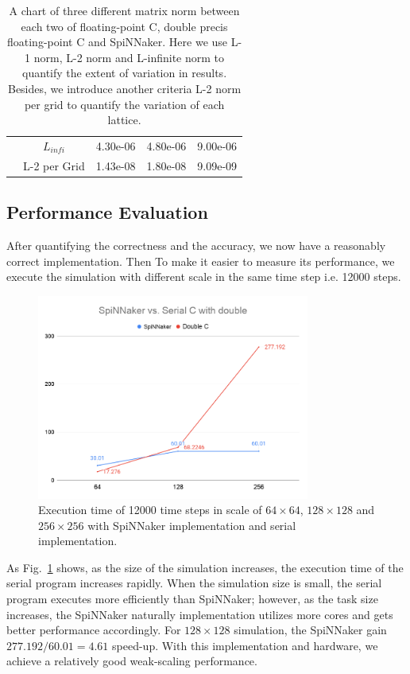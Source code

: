 \begin{table}[tb]
\begin{tabular}{|c|c|c|c|c|}
                     & $L_{infi}$  & 4.30e-06         & 4.80e-06           & 9.00e-06           \\ \cline{2-5} 
                     & L-2 per Grid & 1.43e-08           & 1.80e-08            & 9.09e-09              \\ \hline
\end{tabular}
\caption{A chart of three different matrix norm between each two of floating-point C, double precis floating-point C and SpiNNaker. Here we use L-1 norm, L-2 norm and L-infinite norm to quantify the extent of variation in results. Besides, we introduce another criteria L-2 norm per grid to quantify the variation of each lattice.}
\label{table:norm}
\end{table}

\subsection{Performance Evaluation} \label{sec:perfe}
After quantifying the correctness and the accuracy, we now have a reasonably correct implementation. Then To make it easier to measure its performance, we execute the simulation with different scale in the same time step i.e. 12000 steps.\\

\begin{figure}[tb]
   \centering
       \includegraphics[width=0.8\textwidth]{figures/SpiNNaker vs. Serial C with double.png}
       \caption{Execution time of 12000 time steps in scale of $64\times64$, $128\times128$ and $256\times256$ with SpiNNaker implementation and serial implementation.}
       \label{fig:performance}
\end{figure}

As Fig.~\ref{fig:performance} shows, as the size of the simulation increases, the execution time of the serial program increases rapidly. When the simulation size is small, the serial program executes more efficiently than SpiNNaker; however, as the task size increases, the SpiNNaker naturally implementation utilizes more cores and gets better performance accordingly. For $128\times128$ simulation, the SpiNNaker gain $277.192 / 60.01 = 4.61$ speed-up. With this implementation and hardware, we achieve a relatively good weak-scaling performance.\\

